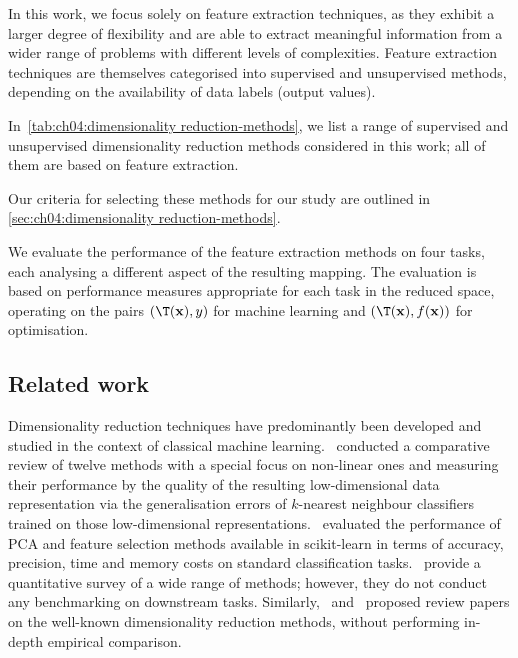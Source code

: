 In this work, we focus solely on feature extraction techniques, as they exhibit a larger degree of flexibility and are able to extract meaningful information from a wider range of problems with different levels of complexities.
Feature extraction techniques are themselves categorised into supervised and unsupervised methods, depending on the availability of data labels (output values).




In~\cref{tab:ch04:dimensionality reduction-methods}, we list a range of supervised and unsupervised dimensionality reduction methods considered in this work; all of them are based on feature extraction.


Our criteria for selecting these methods for our study are outlined in \cref{sec:ch04:dimensionality reduction-methods}.

























We evaluate the performance of the feature extraction methods on four tasks, each analysing a different aspect of the resulting mapping. 
The evaluation is based on performance measures appropriate for each task 
in the reduced space,
operating on the pairs $(\T(\mathbf{x}),y)$ for machine learning and $(\T(\mathbf{x}),f(\mathbf{x}))$ for optimisation.


\subsection{Related work}
\label{sec:ch04:rel-work}




Dimensionality reduction techniques have predominantly been developed and studied in the context of classical machine learning.~\citet{VanEtAl09} conducted a comparative review of twelve methods with a special focus on non-linear ones and measuring their performance by the quality of the resulting low-dimensional data representation via the generalisation errors of $k$-nearest neighbour classifiers trained on those low-dimensional representations.~\citet{SubEtAl24} evaluated the performance of PCA and feature selection methods available in scikit-learn in terms of accuracy, precision, time and memory costs on standard classification tasks.~\citet{EspEtAl21} provide a quantitative survey of a wide range of methods; however, they do not conduct any benchmarking on downstream tasks. Similarly,~\citet{RayEtAl21} and~\citet{JiaEtAl22} proposed review papers on the well-known dimensionality reduction methods, without performing in-depth empirical comparison.

